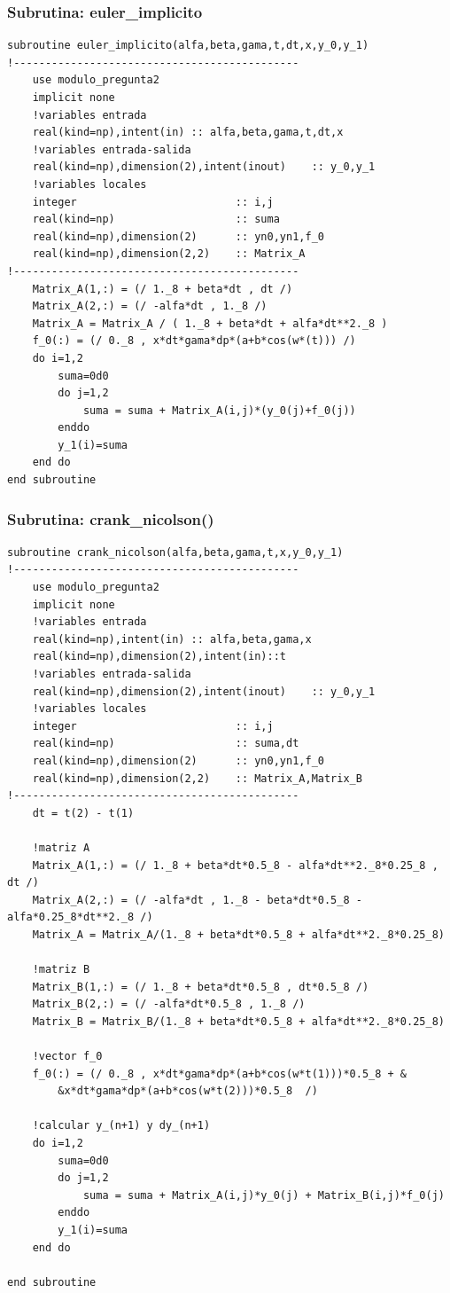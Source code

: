 \documentclass[letterpaper]{article}
\begin{document}
\subsubsection*{Subrutina: euler\_implicito}
\begin{lstlisting}
subroutine euler_implicito(alfa,beta,gama,t,dt,x,y_0,y_1)
!---------------------------------------------
	use modulo_pregunta2
	implicit none
	!variables entrada
	real(kind=np),intent(in) :: alfa,beta,gama,t,dt,x
	!variables entrada-salida
	real(kind=np),dimension(2),intent(inout)	:: y_0,y_1
	!variables locales
	integer							:: i,j
	real(kind=np)					:: suma
	real(kind=np),dimension(2)		:: yn0,yn1,f_0
	real(kind=np),dimension(2,2)	:: Matrix_A
!---------------------------------------------
	Matrix_A(1,:) = (/ 1._8 + beta*dt , dt /)
	Matrix_A(2,:) = (/ -alfa*dt , 1._8 /)
	Matrix_A = Matrix_A / ( 1._8 + beta*dt + alfa*dt**2._8 )
	f_0(:) = (/ 0._8 , x*dt*gama*dp*(a+b*cos(w*(t))) /)
	do i=1,2
		suma=0d0
		do j=1,2
			suma = suma + Matrix_A(i,j)*(y_0(j)+f_0(j)) 
		enddo
		y_1(i)=suma
	end do
end subroutine
\end{lstlisting}

\subsubsection*{Subrutina: crank\_nicolson()}
\begin{lstlisting}
subroutine crank_nicolson(alfa,beta,gama,t,x,y_0,y_1)
!---------------------------------------------
	use modulo_pregunta2
	implicit none
	!variables entrada
	real(kind=np),intent(in) :: alfa,beta,gama,x
	real(kind=np),dimension(2),intent(in)::t
	!variables entrada-salida
	real(kind=np),dimension(2),intent(inout)	:: y_0,y_1
	!variables locales
	integer							:: i,j
	real(kind=np)					:: suma,dt
	real(kind=np),dimension(2)		:: yn0,yn1,f_0
	real(kind=np),dimension(2,2)	:: Matrix_A,Matrix_B
!---------------------------------------------
	dt = t(2) - t(1)
	
	!matriz A
	Matrix_A(1,:) = (/ 1._8 + beta*dt*0.5_8 - alfa*dt**2._8*0.25_8 ,  dt /)
	Matrix_A(2,:) = (/ -alfa*dt , 1._8 - beta*dt*0.5_8 - alfa*0.25_8*dt**2._8 /)
	Matrix_A = Matrix_A/(1._8 + beta*dt*0.5_8 + alfa*dt**2._8*0.25_8)
	
	!matriz B
	Matrix_B(1,:) = (/ 1._8 + beta*dt*0.5_8 , dt*0.5_8 /)
	Matrix_B(2,:) = (/ -alfa*dt*0.5_8 , 1._8 /)
	Matrix_B = Matrix_B/(1._8 + beta*dt*0.5_8 + alfa*dt**2._8*0.25_8)
	
	!vector f_0
	f_0(:) = (/ 0._8 , x*dt*gama*dp*(a+b*cos(w*t(1)))*0.5_8 + &
		&x*dt*gama*dp*(a+b*cos(w*t(2)))*0.5_8  /)
	
	!calcular y_(n+1) y dy_(n+1) 
	do i=1,2
		suma=0d0
		do j=1,2
			suma = suma + Matrix_A(i,j)*y_0(j) + Matrix_B(i,j)*f_0(j) 
		enddo
		y_1(i)=suma
	end do
	
end subroutine
\end{lstlisting}
\end{document}
